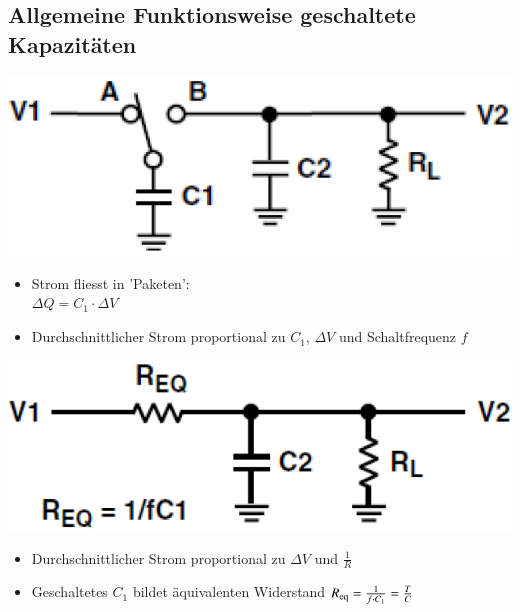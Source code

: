 \subsection{Allgemeine Funktionsweise geschaltete Kapazitäten}

\begin{minipage}[c]{0.46\columnwidth}
    \begin{center}
    \end{center}
    \includegraphics[width=\columnwidth]{images/sc_allgemein.png} 

    \begin{itemize}
        \item Strom fliesst in 'Paketen': \\
            $\Delta Q = C_1 \cdot \Delta V$ 
        \item Durchschnittlicher Strom proportional zu $C_1$, $\Delta V$ und Schaltfrequenz $f$
    \end{itemize}

\end{minipage}
\hfill
\begin{minipage}[c]{0.46\columnwidth}
    \begin{center}
    \end{center}
    \includegraphics[width=\columnwidth]{images/rc_allgemein.png}

    \begin{itemize}
        \item Durchschnittlicher Strom proportional zu $\Delta V$ und $\frac{1}{R}$
        \item Geschaltetes $C_1$ bildet äquivalenten Widerstand $R_{\rm eq} = \frac{1}{f \cdot C_1} = \frac{T}{C}$
    \end{itemize}
\end{minipage}

